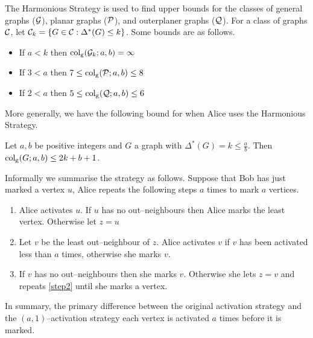 The Harmonious Strategy is used to find upper bounds for the classes of general graphs ($ \mathcal{G} $), planar graphs ($\mathcal{P}$), and outerplaner graphs ($ \mathcal{Q} $). For a class of graphs $\mathcal{C}$, let $\mathcal{C}_k= \{G\in\mathcal{C}: \Delta^*(G)\leq k\}$. Some bounds are as follows.    
\begin{itemize}
    \item If $a < k$ then $\operatorname{col_g}(\mathcal{G}_k;a,b)=\infty$
    \item If $3<a $ then $7\leq \operatorname{col_g}(\mathcal{P};a,b)\leq 8$
    \item If $2< a$ then $5\leq \operatorname{col_g}(\mathcal{Q};a,b)\leq 6$
\end{itemize}
More generally, we have the following bound for when Alice uses the Harmonious Strategy.
\begin{theorem}
    Let $a,b$ be positive integers and $G$ a graph with $\Delta^*(G)=k\leq\frac{a}{b}$. Then $\operatorname{col_g}(G;a,b)\leq 2k+b+1$.
\end{theorem}




Informally we summarise the strategy as follows. Suppose that Bob has just marked a vertex $u$, Alice repeats the following steps $a$ times to mark $a$ vertices.
\begin{enumerate}
    \item Alice activates $u$. If $u$ has no out--neighbours then Alice marks the least vertex. Otherwise let $z=u$
    
    \item Let $v$ be the least out--neighbour of $z$. Alice activates $v$ if $v$ has been activated less than $a$ times, otherwise she marks $v$. \label{step2}
    
    \item If $v$ has no out--neighbours then she marks $v$. Otherwise she lets $z=v$ and repeats \ref{step2} until she marks a vertex.     
\end{enumerate}
In summary, the primary difference between the original activation strategy and the $(a,1)$--activation strategy each vertex is activated $a$ times before it is marked.


